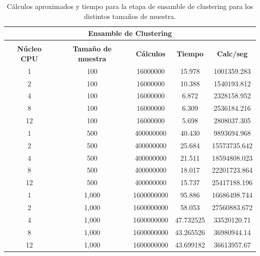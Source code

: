 \begin{table}[]
	\centering
	\begin{tabular}{|c|c|c|c|c|}
		\hline
		\multicolumn{5}{|c|}{\cellcolor[HTML]{DAE8FC}\textbf{Ensamble de Clustering}} \\ \hline
		\cellcolor[HTML]{DAE8FC} &
		\cellcolor[HTML]{DAE8FC} &
		\cellcolor[HTML]{DAE8FC} &
		\cellcolor[HTML]{DAE8FC} &
		\cellcolor[HTML]{DAE8FC} \\
		\multirow{-2}{*}{\cellcolor[HTML]{DAE8FC}\textbf{Núcleo CPU}} &
		\multirow{-2}{*}{\cellcolor[HTML]{DAE8FC}\textbf{Tamaño de muestra}} &
		\multirow{-2}{*}{\cellcolor[HTML]{DAE8FC}\textbf{Cálculos}} &
		\multirow{-2}{*}{\cellcolor[HTML]{DAE8FC}\textbf{Tiempo}} &
		\multirow{-2}{*}{\cellcolor[HTML]{DAE8FC}\textbf{Calc/seg}} \\ \hline
		1        & 100         & 16000000        & 15.978         & 1001359.283       \\ \hline
		2        & 100         & 16000000        & 10.388         & 1540193.812       \\ \hline
		4        & 100         & 16000000        & 6.872          & 2328158.952       \\ \hline
		8        & 100         & 16000000        & 6.309          & 2536184.216       \\ \hline
		12       & 100         & 16000000        & 5.698          & 2808037.305       \\ \hline
		1        & 500         & 400000000       & 40.430         & 9893694.968       \\ \hline
		2        & 500         & 400000000       & 25.684         & 15573735.642      \\ \hline
		4        & 500         & 400000000       & 21.511         & 18594808.023      \\ \hline
		8        & 500         & 400000000       & 18.017         & 22201723.864      \\ \hline
		12       & 500         & 400000000       & 15.737         & 25417188.196      \\ \hline
		1        & 1,000       & 1600000000      & 95.886         & 16686498.744      \\ \hline
		2        & 1,000       & 1600000000      & 58.053         & 27560883.672      \\ \hline
		4        & 1,000       & 1600000000      & 47.732525      & 33520120.71       \\ \hline
		8        & 1,000       & 1600000000      & 43.265526      & 36980944.14       \\ \hline
		12       & 1,000       & 1600000000      & 43.699182      & 36613957.67       \\ \hline
	\end{tabular}
	\caption{Cálculos aproximados y tiempo para la etapa de ensamble de clustering para los distintos tamaños de muestra.}
	\label{tab:calc-ensamble}
\end{table}

